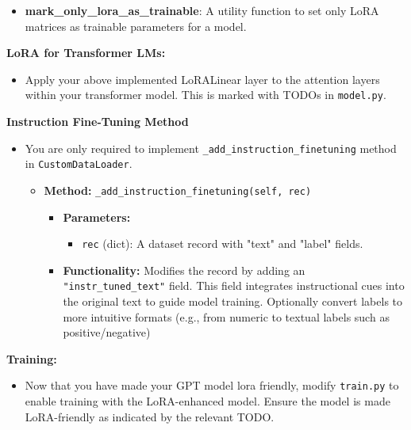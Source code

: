 \documentclass[11pt,addpoints,answers]{exam}
\begin{document}
\begin{questions}
\begin{itemize}
\begin{itemize}
    \end{itemize}
        \item \textbf{mark\_only\_lora\_as\_trainable}: A utility function to set only LoRA matrices as trainable parameters for a model. 
\end{itemize}


\textbf{LoRA for Transformer LMs:}
\begin{itemize}
    \item Apply your above implemented LoRALinear layer to the attention layers within your transformer model. This is marked with TODOs in \texttt{model.py}. 
\end{itemize}

\textbf{Instruction Fine-Tuning Method}
\begin{itemize}
    

\item You are only required to implement  \texttt{\_add\_instruction\_finetuning} method in \texttt{CustomDataLoader}.

    \begin{itemize}
        \item \textbf{Method:} \texttt{\_add\_instruction\_finetuning(self, rec)}
        \begin{itemize}
            \item \textbf{Parameters:}
            \begin{itemize}
                \item \texttt{rec} (dict): A dataset record with "text" and "label" fields.
            \end{itemize}
            \item \textbf{Functionality:} Modifies the record by adding an \texttt{"instr\_tuned\_text"} field. This field integrates instructional cues into the original text to guide model training. Optionally convert labels to more intuitive formats (e.g., from numeric to textual labels such as positive/negative)
        \end{itemize}
        
    \end{itemize}
\end{itemize}
\textbf{Training:}
\begin{itemize}
    \item Now that you have made your GPT model lora friendly, modify \lstinline{train.py} to enable training with the LoRA-enhanced model. Ensure the model is made LoRA-friendly as indicated by the relevant TODO.
\end{itemize}



\end{questions}
\end{document}
